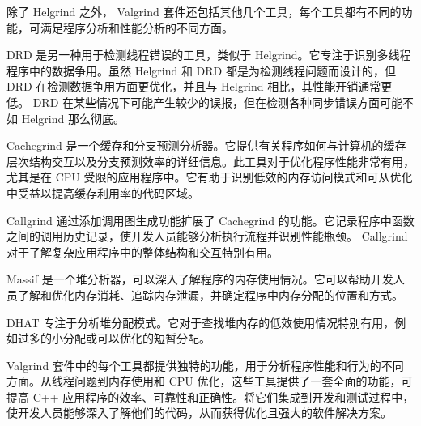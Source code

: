 
除了 Helgrind 之外， Valgrind 套件还包括其他几个工具，每个工具都有不同的功能，可满足程序分析和性能分析的不同方面。


DRD 是另一种用于检测线程错误的工具，类似于 Helgrind。它专注于识别多线程程序中的数据争用。虽然 Helgrind 和 DRD 都是为检测线程问题而设计的，但 DRD 在检测数据争用方面更优化，并且与 Helgrind 相比，其性能开销通常更低。 DRD 在某些情况下可能产生较少的误报，但在检测各种同步错误方面可能不如 Helgrind 那么彻底。


Cachegrind 是一个缓存和分支预测分析器。它提供有关程序如何与计算机的缓存层次结构交互以及分支预测效率的详细信息。此工具对于优化程序性能非常有用，尤其是在 CPU 受限的应用程序中。它有助于识别低效的内存访问模式和可从优化中受益以提高缓存利用率的代码区域。


Callgrind 通过添加调用图生成功能扩展了 Cachegrind 的功能。它记录程序中函数之间的调用历史记录，使开发人员能够分析执行流程并识别性能瓶颈。 Callgrind 对于了解复杂应用程序中的整体结构和交互特别有用。


Massif 是一个堆分析器，可以深入了解程序的内存使用情况。它可以帮助开发人员了解和优化内存消耗、追踪内存泄漏，并确定程序中内存分配的位置和方式。


DHAT 专注于分析堆分配模式。它对于查找堆内存的低效使用情况特别有用，例如过多的小分配或可以优化的短暂分配。

Valgrind 套件中的每个工具都提供独特的功能，用于分析程序性能和行为的不同方面。从线程问题到内存使用和 CPU 优化，这些工具提供了一套全面的功能，可提高 C++ 应用程序的效率、可靠性和正确性。将它们集成到开发和测试过程中，使开发人员能够深入了解他们的代码，从而获得优化且强大的软件解决方案。
